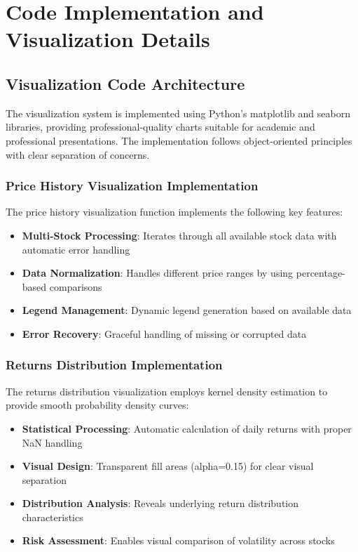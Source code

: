 \documentclass[12pt,a4paper]{article}
\begin{document}
\section{Code Implementation and Visualization Details}

\subsection{Visualization Code Architecture}

The visualization system is implemented using Python's matplotlib and seaborn libraries, providing professional-quality charts suitable for academic and professional presentations. The implementation follows object-oriented principles with clear separation of concerns.

\subsubsection{Price History Visualization Implementation}

The price history visualization function implements the following key features:

\begin{itemize}
\item \textbf{Multi-Stock Processing}: Iterates through all available stock data with automatic error handling
\item \textbf{Data Normalization}: Handles different price ranges by using percentage-based comparisons
\item \textbf{Legend Management}: Dynamic legend generation based on available data
\item \textbf{Error Recovery}: Graceful handling of missing or corrupted data
\end{itemize}

\subsubsection{Returns Distribution Implementation}

The returns distribution visualization employs kernel density estimation to provide smooth probability density curves:

\begin{itemize}
\item \textbf{Statistical Processing}: Automatic calculation of daily returns with proper NaN handling
\item \textbf{Visual Design}: Transparent fill areas (alpha=0.15) for clear visual separation
\item \textbf{Distribution Analysis}: Reveals underlying return distribution characteristics
\item \textbf{Risk Assessment}: Enables visual comparison of volatility across stocks
\end{itemize}
\end{document}
